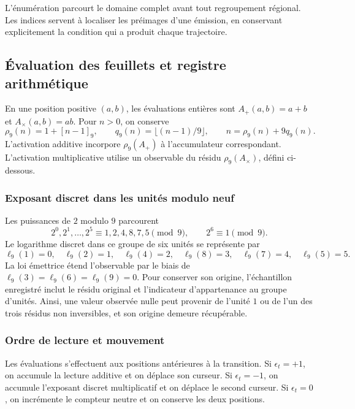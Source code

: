 L'énumération parcourt le domaine complet avant tout regroupement
régional. Les indices servent à localiser les préimages d'une
émission, en conservant explicitement la condition qui a produit chaque trajectoire.

\subsection{Évaluation des feuillets et registre arithmétique}
\label{act21:tpk:lecturas}

En une position positive \((a,b)\), les évaluations entières sont
\(A_+(a,b)=a+b\) et \(A_\times(a,b)=ab\). Pour \(n>0\), on conserve
\begin{equation}
 \rho_9(n)=1+[n-1]_9,\qquad
 q_9(n)=\lfloor(n-1)/9\rfloor,\qquad
 n=\rho_9(n)+9q_9(n).
 \label{act21:tpk:division-evaluacion}
\end{equation}
L'activation additive incorpore \(\rho_9(A_+)\) à l'accumulateur correspondant. L'activation multiplicative utilise un observable du résidu \(\rho_9(A_\times)\), défini ci-dessous.

\subsubsection{Exposant discret dans les unités modulo neuf}

Les puissances de \(2\) modulo \(9\) parcourent
\[
 2^0,2^1,\ldots,2^5\equiv1,2,4,8,7,5\pmod9,
 \qquad 2^6\equiv1\pmod9.
\]
Le logarithme discret dans ce groupe de six unités se représente par
\begin{equation}
 \ell_9(1)=0,\quad\ell_9(2)=1,\quad\ell_9(4)=2,
 \quad\ell_9(8)=3,\quad\ell_9(7)=4,\quad\ell_9(5)=5.
 \label{act21:tpk:logaritmo}
\end{equation}
La loi émettrice étend l'observable par le biais de \(\ell_9(3)=\ell_9(6)=\ell_9(9)=0\). Pour conserver son origine, l'échantillon enregistré inclut le résidu original et l'indicateur d'appartenance au groupe d'unités. Ainsi, une valeur observée nulle peut provenir de l'unité \(1\) ou de l'un des trois résidus non inversibles, et son origine demeure récupérable.

\subsubsection{Ordre de lecture et mouvement}

Les évaluations s'effectuent aux positions antérieures à la transition.
Si \(\epsilon_t=+1\), on accumule la lecture additive et on déplace son curseur.
Si \(\epsilon_t=-1\), on accumule l'exposant discret multiplicatif et on
déplace le second curseur. Si \(\epsilon_t=0\), on incrémente le compteur
neutre et on conserve les deux positions.

